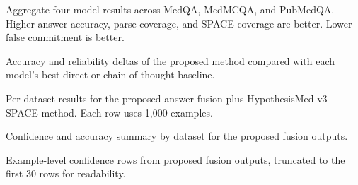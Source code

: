 
\begin{table}[t]
\centering
\caption{Aggregate four-model results across MedQA, MedMCQA, and PubMedQA. Higher answer accuracy, parse coverage, and SPACE coverage are better. Lower false commitment is better.}
\label{tab:aggregate}
\resizebox{\textwidth}{!}{%

}
\end{table}

\begin{table}[t]
\centering
\caption{Accuracy and reliability deltas of the proposed method compared with each model's best direct or chain-of-thought baseline.}
\label{tab:deltas}
\resizebox{\textwidth}{!}{%

}
\end{table}

\begin{table}[t]
\centering
\caption{Per-dataset results for the proposed answer-fusion plus HypothesisMed-v3 SPACE method. Each row uses 1,000 examples.}
\label{tab:perdataset}
\resizebox{\textwidth}{!}{%

}
\end{table}

\begin{table}[t]
\centering
\caption{Confidence and accuracy summary by dataset for the proposed fusion outputs.}
\label{tab:confidence_dataset}
\resizebox{\linewidth}{!}{%

}
\end{table}

\begin{table}[t]
\centering
\caption{Example-level confidence rows from proposed fusion outputs, truncated to the first 30 rows for readability.}
\label{tab:confidence_rows}
\resizebox{\textwidth}{!}{%

}
\end{table}

